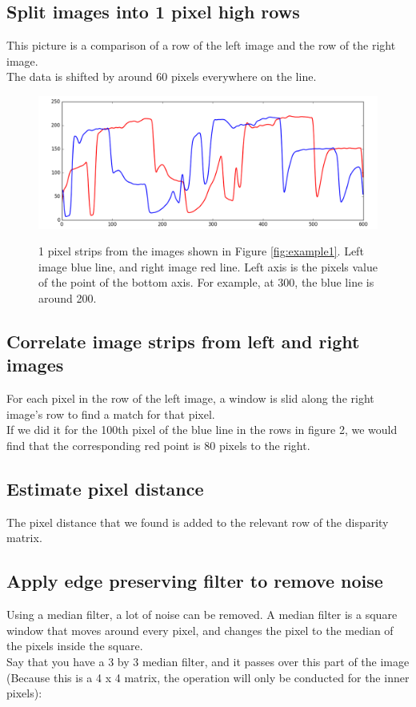 \documentclass[11pt,fleqn]{article}
\begin{document}
\subsection{Split images into 1 pixel high rows}

This picture is a comparison of a row of the left image and the row of the right image. \\
The data is shifted by around 60 pixels everywhere on the line.

\begin{figure}[!ht]
\label{fig:strips}
\centering
\includegraphics[width=1\textwidth]{images/strips.png} \\[2pt]
\caption{1 pixel strips from the images shown in Figure \ref{fig:example1}. Left image blue line, and right image red line. Left axis is the pixels value of the point of the bottom axis. For example, at 300, the blue line is around 200.}
\end{figure}

\subsection{Correlate image strips from left and right images}
For each pixel in the row of the left image, a window is slid along the right image's row to find a match for that pixel.\\
If we did it for the 100th pixel of the blue line in the rows in figure 2, we would find that the corresponding red point is 80 pixels to the right.

\subsection{Estimate pixel distance}
The pixel distance that we found is added to the relevant row of the disparity matrix.

\subsection{Apply edge preserving filter to remove noise}
Using a median filter, a lot of noise can be removed. A median filter is a square window that moves around every pixel, and changes the pixel to the median of the pixels inside the square.\\
Say that you have a 3 by 3 median filter, and it passes over this part of the image (Because this is a 4 x 4 matrix, the operation will only be conducted for the inner pixels):
\end{document}
